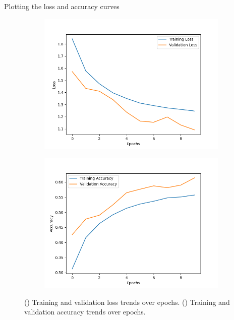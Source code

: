 \begin{code}[h!]
	    
	
	\caption{Plotting the loss and accuracy curves}
	\label{code:cnnLossAccuracyPlot}
\end{code}

\begin{figure}[h!]
	\centering
	
	\begin{subfigure}{0.45\textwidth}
		\includegraphics[width=\linewidth]{Images/DataMining/lossPlot}
		\caption{}    %
		\label{subfig:lossTrends}
	\end{subfigure}
	\hfill
	\begin{subfigure}{0.45\textwidth}
		\includegraphics[width=\linewidth]{Images/DataMining/accuracyPlot}
		\caption{}    %
		\label{subfig:accuracyTrends}
	\end{subfigure}
	
	\caption{() Training and validation loss trends over epochs. () Training and validation accuracy trends over epochs.}
	\label{fig:AccuracyandLoss}
\end{figure}


